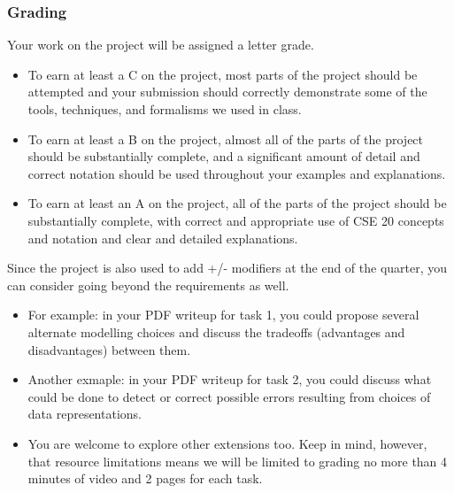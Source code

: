 \subsubsection*{Grading}
Your work on the project will be assigned a letter grade. 
\begin{itemize}
\item To earn at least a C on the project, most parts of the project should be attempted
and your submission should correctly demonstrate some of the tools, techniques, and formalisms we 
used in class. 
\item To earn at least a B on the project, almost all of the parts of the project should be 
substantially complete, and a significant amount of detail and correct notation should be 
used throughout your examples and explanations.
\item To earn at least an A on the project, all of the parts of the project should be substantially complete,
with correct and appropriate use of CSE 20 concepts and notation and clear and detailed explanations.
\end{itemize}

Since the project is also used to add +/- modifiers at the end of the quarter, you can consider going beyond
the requirements as well.
\begin{itemize}
    \item For example: in your PDF writeup for task 1, you could propose several alternate modelling choices and 
discuss the tradeoffs (advantages and disadvantages) between them. 
    \item Another exmaple: in your PDF writeup for 
task 2, you could discuss what could be done to detect or correct possible errors resulting from choices of
data representations. 
    \item You are welcome to explore other extensions too.  Keep in mind, however, that resource limitations
    means we will be limited to grading no more than 4 minutes of video and 2 pages for each task.
\end{itemize}
\newpage%



\setlength{\evensidemargin}{0in}
\setlength{\oddsidemargin}{0in}
\setlength{\textwidth}{6.6in}
\setlength{\textheight}{8.8in}
\setlength{\topmargin}{0in}
\setlength{\footskip}{0.45in}
\renewcommand{\baselinestretch}{1}
\newlength{\saveparindent}
\setlength{\saveparindent}{\parindent}

